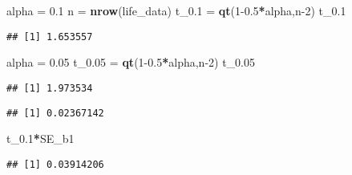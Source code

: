 \documentclass[
]{article}
\newenvironment{Shaded}{\begin{snugshade}}{\end{snugshade}}
\newcommand{\DecValTok}[1]{\textcolor[rgb]{0.00,0.00,0.81}{#1}}
\newcommand{\FloatTok}[1]{\textcolor[rgb]{0.00,0.00,0.81}{#1}}
\newcommand{\FunctionTok}[1]{\textcolor[rgb]{0.13,0.29,0.53}{\textbf{#1}}}
\newcommand{\NormalTok}[1]{#1}
\newcommand{\OtherTok}[1]{\textcolor[rgb]{0.56,0.35,0.01}{#1}}
\newcommand{\SpecialCharTok}[1]{\textcolor[rgb]{0.81,0.36,0.00}{\textbf{#1}}}
\begin{document}
\begin{Shaded}
\begin{Highlighting}[]
\NormalTok{alpha }\OtherTok{=} \FloatTok{0.1}
\NormalTok{n }\OtherTok{=} \FunctionTok{nrow}\NormalTok{(life\_data)}
\NormalTok{t\_0}\FloatTok{.1} \OtherTok{=} \FunctionTok{qt}\NormalTok{(}\DecValTok{1}\FloatTok{{-}0.5}\SpecialCharTok{*}\NormalTok{alpha,n}\DecValTok{{-}2}\NormalTok{)}
\NormalTok{t\_0}\FloatTok{.1}
\end{Highlighting}
\end{Shaded}

\begin{verbatim}
## [1] 1.653557
\end{verbatim}

\begin{Shaded}
\begin{Highlighting}[]
\NormalTok{alpha }\OtherTok{=} \FloatTok{0.05}
\NormalTok{t\_0}\FloatTok{.05} \OtherTok{=} \FunctionTok{qt}\NormalTok{(}\DecValTok{1}\FloatTok{{-}0.5}\SpecialCharTok{*}\NormalTok{alpha,n}\DecValTok{{-}2}\NormalTok{)}
\NormalTok{t\_0}\FloatTok{.05}
\end{Highlighting}
\end{Shaded}

\begin{verbatim}
## [1] 1.973534
\end{verbatim}

\begin{Shaded}
\end{Shaded}

\begin{verbatim}
## [1] 0.02367142
\end{verbatim}

\begin{Shaded}
\begin{Highlighting}[]
\NormalTok{t\_0}\FloatTok{.1}\SpecialCharTok{*}\NormalTok{SE\_b1}
\end{Highlighting}
\end{Shaded}

\begin{verbatim}
## [1] 0.03914206
\end{verbatim}
\end{document}
